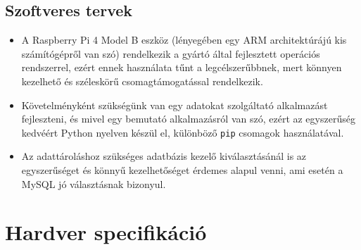 \documentclass[11pt, a4paper]{article}
\begin{document}
		\subsection{Szoftveres tervek}
			\begin{itemize}
				\justifying
				\item A Raspberry Pi 4 Model B eszköz (lényegében egy ARM architektúrájú kis számítógépről van szó) rendelkezik a gyártó által fejlesztett operációs rendszerrel, ezért ennek használata tűnt a legcélszerűbbnek, mert könnyen kezelhető és széleskörű csomagtámogatással rendelkezik.
				
				\item Követelményként szükségünk van egy adatokat szolgáltató alkalmazást fejleszteni, és mivel egy bemutató alkalmazásról van szó, ezért az egyszerűség kedvéért Python nyelven készül el, különböző \texttt{pip} csomagok használatával.
				
				\item Az adattároláshoz szükséges adatbázis kezelő kiválasztásánál is az egyszerűséget és könnyű kezelhetőséget érdemes alapul venni, ami esetén a MySQL jó választásnak bizonyul.
			\end{itemize}
		\vfill
	
	\section{Hardver specifikáció}			
\end{document}
